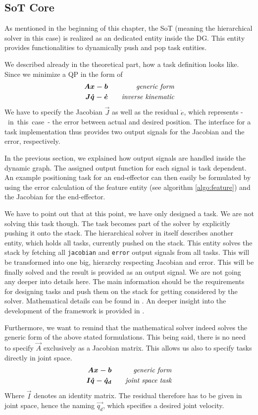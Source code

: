 \newpage
\subsection{SoT Core}
As mentioned in the beginning of this chapter, the SoT (meaning the hierarchical solver in this case) is realized as an dedicated entity inside the DG. This entity provides functionalities to dynamically push and pop task entities. 

We described already in the theoretical part, how a task definition looks like. Since we minimize a QP in the form of 
\begin{eqnarray}
\vec{Ax -b} &\quad& \textit{generic form} \notag \\
\vec{J \dot{q} - \dot{e}} &\quad& \textit{inverse kinematic} \notag
\end{eqnarray}
We have to specify the Jacobian $\vec{J}$ as well as the residual $\dot{e}$, which represents \mbox{- in this case -} the error between actual and desired position. 
The interface for a task implementation thus provides two output signals for the Jacobian and the error, respectively. 

In the previous section, we explained how output signals are handled inside the dynamic graph. The assigned output function for each signal is task dependent. An example positioning task for an end-effector can then easily be formulated by using the error calculation of the feature entity (see algorithm \ref{algo:feature}) and the Jacobian for the end-effector. 

We have to point out that at this point, we have only designed a task. We are not solving this task though. The task becomes part of the solver by explicitly pushing it onto the stack. The hierarchical solver in itself describes another entity, which holds all tasks, currently pushed on the stack. This entity solves the stack by fetching all \texttt{jacobian} and \texttt{error} output signals from all tasks. This will be transformed into one big, hierarchy respecting Jacobian and error. This will be finally solved and the result is provided as an output signal. We are not going any deeper into details here. The main information should be the requirements for designing tasks and push them on the stack for getting considered by the solver. Mathematical details can be found in \cite{escande-icra-10}\cite{escande:ijrr:2014}. An deeper insight into the development of the framework is provided in \cite{mansard-tro-09}.

Furthermore, we want to remind that the mathematical solver indeed solves the generic form of the above stated formulations. This being said, there is no need to specify $\vec{A}$ exclusively as a Jacobian matrix. This allows us also to specify tasks directly in joint space. 
\begin{eqnarray}
\vec{Ax -b} &\quad& \textit{generic form} \notag \\
\vec{I \dot{q} - \dot{q}_d} &\quad& \textit{joint space task} \notag
\end{eqnarray}
Where $\vec{I}$ denotes an identity matrix. The residual therefore has to be given in joint space, hence the naming $\vec{q_d}$, which specifies a desired joint velocity.

